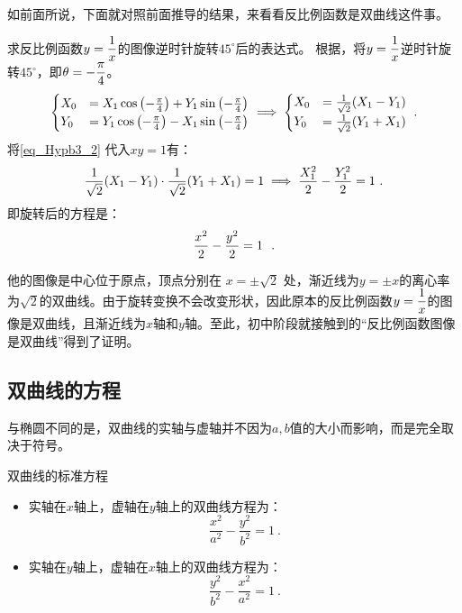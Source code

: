 如前面所说，下面就对照前面推导的结果，来看看反比例函数是双曲线这件事。

\begin{example}{求反比例函数$\displaystyle y={1\over x}$的图像逆时针旋转$45^\circ$后的表达式。}
根据，将$\displaystyle y={1\over x}$逆时针旋转$45^\circ$，即$\displaystyle\theta=-{\pi\over4}$。
\begin{equation}\label{eq_Hypb3_2}
\begin{cases}
\displaystyle
X_0&=X_1 \cos \left(-{\pi\over4}\right) + Y_1 \sin \left(-{\pi\over4}\right)\\
Y_0&=Y_1 \cos \left(-{\pi\over4}\right) - X_1 \sin \left(-{\pi\over4}\right)\\
\end{cases}\implies
\begin{cases}
X_0&={1\over\sqrt{2}}(X_1 - Y_1)\\
Y_0&={1\over\sqrt{2}}(Y_1+ X_1) \\
\end{cases}~.
\end{equation}
将\autoref{eq_Hypb3_2} 代入$xy=1$有：
\begin{equation}
\displaystyle
{1\over\sqrt{2}}(X_1 - Y_1)\cdot{1\over\sqrt{2}}(Y_1+ X_1)=1\implies {X_1^2\over2}- {Y_1^2\over2}=1~.
\end{equation}
即旋转后的方程是：
\begin{equation}
{x^2\over2}- {y^2\over2}=1~~.
\end{equation}
\end{example}

他的图像是中心位于原点，顶点分别在 $x = \pm \sqrt{2}$ 处，渐近线为$y = \pm x$的离心率为$\sqrt{2}$的双曲线。由于旋转变换不会改变形状，因此原本的反比例函数$\displaystyle y={1\over x}$的图像是双曲线，且渐近线为$x$轴和$y$轴。至此，初中阶段就接触到的“反比例函数图像是双曲线”得到了证明。

\subsection{双曲线的方程}

与椭圆不同的是，双曲线的实轴与虚轴并不因为$a,b$值的大小而影响，而是完全取决于符号。
\begin{theorem}{双曲线的标准方程}
\begin{itemize}
\item 实轴在$x$轴上，虚轴在$y$轴上的双曲线方程为：
\begin{equation}\label{eq_Hypb3_4}
\frac{x^2}{a^2} - \frac{y^2}{b^2} = 1~.
\end{equation}
\item 实轴在$y$轴上，虚轴在$x$轴上的双曲线方程为：
\begin{equation}
\frac{y^2}{b^2} -\frac{x^2}{a^2}  = 1~.
\end{equation}
\end{itemize}
\end{theorem}

